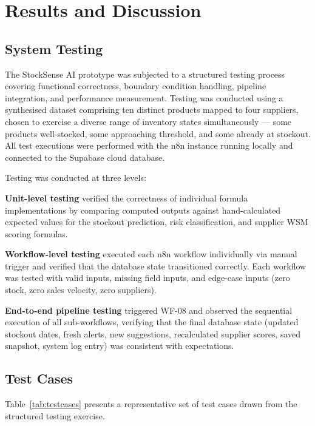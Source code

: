\chapter{Results and Discussion}
\label{ch:results}

\section{System Testing}

The StockSense AI prototype was subjected to a structured testing process covering functional
correctness, boundary condition handling, pipeline integration, and performance measurement.
Testing was conducted using a synthesised dataset comprising ten distinct products mapped to
four suppliers, chosen to exercise a diverse range of inventory states simultaneously — some
products well-stocked, some approaching threshold, and some already at stockout. All test
executions were performed with the n8n instance running locally and connected to the
Supabase cloud database.

Testing was conducted at three levels:

\textbf{Unit-level testing} verified the correctness of individual formula implementations
by comparing computed outputs against hand-calculated expected values for the stockout
prediction, risk classification, and supplier WSM scoring formulas.

\textbf{Workflow-level testing} executed each n8n workflow individually via manual trigger and
verified that the database state transitioned correctly. Each workflow was tested with valid
inputs, missing field inputs, and edge-case inputs (zero stock, zero sales velocity, zero
suppliers).

\textbf{End-to-end pipeline testing} triggered WF-08 and observed the sequential execution of
all sub-workflows, verifying that the final database state (updated stockout dates, fresh alerts,
new suggestions, recalculated supplier scores, saved snapshot, system log entry) was consistent
with expectations.

\section{Test Cases}

Table~\ref{tab:testcases} presents a representative set of test cases drawn from the structured
testing exercise.

